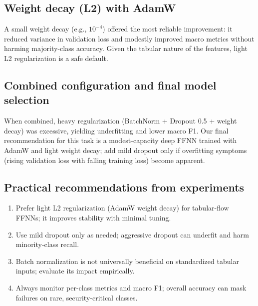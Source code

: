     \subsection{Weight decay (L2) with AdamW}

        A small weight decay (e.g., $10^{-4}$) offered the most reliable improvement: it reduced variance in validation loss and modestly improved macro metrics without harming majority-class accuracy. 
        Given the tabular nature of the features, light L2 regularization is a safe default.

    \subsection{Combined configuration and final model selection}

        When combined, heavy regularization (BatchNorm + Dropout 0.5 + weight decay) was excessive, yielding underfitting and lower macro F1. 
        Our final recommendation for this task is a modest-capacity deep FFNN trained with AdamW and light weight decay; add mild dropout only if overfitting symptoms (rising validation loss with falling training loss) become apparent.

    \subsection{Practical recommendations from experiments}

        \begin{enumerate}
            \item Prefer light L2 regularization (AdamW weight decay) for tabular-flow FFNNs; it improves stability with minimal tuning.
            \item Use mild dropout only as needed; aggressive dropout can underfit and harm minority-class recall.
            \item Batch normalization is not universally beneficial on standardized tabular inputs; evaluate its impact empirically.
            \item Always monitor per-class metrics and macro F1; overall accuracy can mask failures on rare, security-critical classes.
        \end{enumerate}

